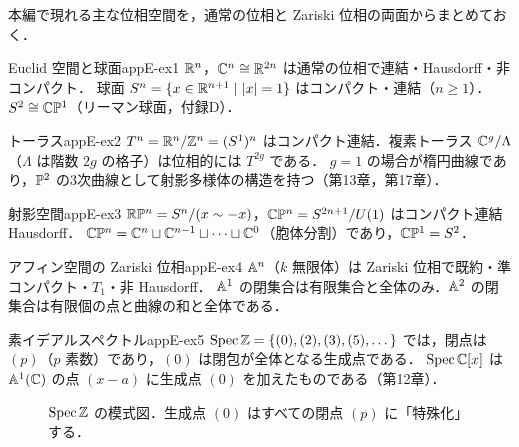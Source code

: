 本編で現れる主な位相空間を，通常の位相と Zariski 位相の両面からまとめておく．

\begin{myex}{Euclid 空間と球面}{appE-ex1}
$\mathbb{R}^n$，$\mathbb{C}^n\cong\mathbb{R}^{2n}$ は通常の位相で連結・Hausdorff・非コンパクト．
球面 $S^n=\{x\in\mathbb{R}^{n+1}\mid|x|=1\}$ はコンパクト・連結（$n\geq1$）．$S^2\cong\mathbb{C}\mathbb{P}^1$（リーマン球面，付録D）．
\end{myex}

\begin{myex}{トーラス}{appE-ex2}
$T^n=\mathbb{R}^n/\mathbb{Z}^n=(S^1)^n$ はコンパクト連結．複素トーラス $\mathbb{C}^g/\Lambda$（$\Lambda$ は階数 $2g$ の格子）は位相的には $T^{2g}$ である．
$g=1$ の場合が楕円曲線であり，$\mathbb{P}^2$ の3次曲線として射影多様体の構造を持つ（第13章，第17章）．
\end{myex}

\begin{myex}{射影空間}{appE-ex3}
$\mathbb{R}\mathbb{P}^n=S^n/(x\sim-x)$，$\mathbb{C}\mathbb{P}^n=S^{2n+1}/U(1)$ はコンパクト連結 Hausdorff．
$\mathbb{C}\mathbb{P}^n=\mathbb{C}^n\sqcup\mathbb{C}^{n-1}\sqcup\cdots\sqcup\mathbb{C}^0$（胞体分割）であり，$\mathbb{C}\mathbb{P}^1=S^2$．
\end{myex}

\begin{myex}{アフィン空間の Zariski 位相}{appE-ex4}
$\mathbb{A}^n$（$k$ 無限体）は Zariski 位相で既約・準コンパクト・$T_1$・非 Hausdorff．
$\mathbb{A}^1$ の閉集合は有限集合と全体のみ．$\mathbb{A}^2$ の閉集合は有限個の点と曲線の和と全体である．
\end{myex}

\begin{myex}{素イデアルスペクトル}{appE-ex5}
$\operatorname{Spec}\mathbb{Z}=\{(0),(2),(3),(5),\dots\}$ では，閉点は $(p)$（$p$ 素数）であり，$(0)$ は閉包が全体となる生成点である．
$\operatorname{Spec}\mathbb{C}[x]$ は $\mathbb{A}^1(\mathbb{C})$ の点 $(x-a)$ に生成点 $(0)$ を加えたものである（第12章）．
\end{myex}

\begin{figure}[H]
\centering
{}
\caption{$\operatorname{Spec}\mathbb{Z}$ の模式図．生成点 $(0)$ はすべての閉点 $(p)$ に「特殊化」する．}
\end{figure}
